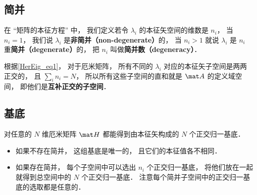 \subsection{简并}
在 “矩阵的本征方程” 中， 我们定义若令 $\lambda_i$ 的本征矢空间的维数是 $n_i$， 当 $n_i = 1$， 我们说 $\lambda_i$ 是\textbf{非简并（non-degenerate）}的， 当 $n_i > 1$ 就说 $\lambda_i$ 是 $n_i$ 重\textbf{简并（degenerate）}的， 把 $n_i$ 叫做\textbf{简并数（degeneracy）}．

根据\autoref{HerEig_eq1}， 对于厄米矩阵， 所有不同的 $\lambda_i$ 对应的本征矢子空间是两两正交的， 且 $\sum_i n_i = N$， 所以所有这些子空间的直和就是 $\mat A$ 的定义域空间， 即他们是\textbf{互补正交的子空间}．

\subsection{基底}
对任意的 $N$ 维厄米矩阵 $\mat H$ 都能得到由本征矢构成的 $N$ 个正交归一基底．
\begin{itemize}
\item 如果不存在简并， 这组基底是唯一的， 且它们的本征值各不相同．
\item 如果存在简并， 每个子空间中可以选出 $n_i$ 个正交归一基底， 将他们放在一起就得到总空间中的 $N$ 个正交归一基底． 注意每个简并子空间中的正交归一基底的选取都是任意的．
\end{itemize}
